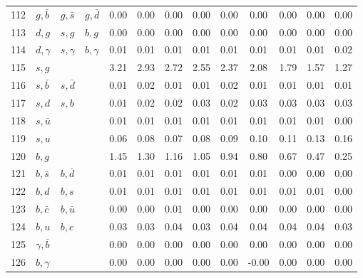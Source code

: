 \begin{tabularx}{\textwidth}{rXXX@{}S@{}S@{}S@{}S@{}S@{}S@{}S@{}S@{}S}
112 & $g, \bar b$      & $g, \bar s$       & $g, \bar d$      &  0.00 &  0.00 &  0.00 &  0.00 &  0.00 &  0.00 &  0.00 &  0.00 &  0.00 \\
113 & $d, g$           & $s,  g$           & $b,  g$          &  0.00 &  0.00 &  0.00 &  0.00 &  0.00 &  0.00 &  0.00 &  0.00 &  0.00 \\
114 & $d, \gamma$      & $s, \gamma$       & $b, \gamma$      &  0.01 &  0.01 &  0.01 &  0.01 &  0.01 &  0.01 &  0.01 &  0.01 &  0.02 \\
115 & $s, g$           &                   &                  &  3.21 &  2.93 &  2.72 &  2.55 &  2.37 &  2.08 &  1.79 &  1.57 &  1.27 \\
116 & $s, \bar b$      & $s, \bar d$       &                  &  0.01 &  0.02 &  0.01 &  0.01 &  0.02 &  0.01 &  0.01 &  0.01 &  0.01 \\
117 & $s, d$           & $s,  b$           &                  &  0.01 &  0.02 &  0.02 &  0.03 &  0.02 &  0.03 &  0.03 &  0.03 &  0.03 \\
118 & $s, \bar u$      &                   &                  &  0.01 &  0.01 &  0.01 &  0.01 &  0.01 &  0.01 &  0.01 &  0.01 &  0.00 \\
119 & $s, u$           &                   &                  &  0.06 &  0.08 &  0.07 &  0.08 &  0.09 &  0.10 &  0.11 &  0.13 &  0.16 \\
120 & $b, g$           &                   &                  &  1.45 &  1.30 &  1.16 &  1.05 &  0.94 &  0.80 &  0.67 &  0.47 &  0.25 \\
121 & $b, \bar s$      & $b, \bar d$       &                  &  0.01 &  0.01 &  0.01 &  0.01 &  0.01 &  0.01 &  0.00 &  0.00 &  0.00 \\
122 & $b, d$           & $b,  s$           &                  &  0.01 &  0.01 &  0.01 &  0.01 &  0.01 &  0.01 &  0.01 &  0.01 &  0.00 \\
123 & $b, \bar c$      & $b, \bar u$       &                  &  0.00 &  0.00 &  0.01 &  0.00 &  0.00 &  0.00 &  0.00 &  0.00 &  0.00 \\
124 & $b, u$           & $b,  c$           &                  &  0.03 &  0.03 &  0.04 &  0.03 &  0.04 &  0.04 &  0.04 &  0.04 &  0.03 \\
125 & $\gamma, \bar b$ &                   &                  &  0.00 &  0.00 &  0.00 &  0.00 &  0.00 &  0.00 &  0.00 &  0.00 &  0.00 \\
126 & $b, \gamma$      &                   &                  &  0.00 &  0.00 &  0.00 &  0.00 &  0.00 & -0.00 &  0.00 &  0.00 &  0.00 \\

\end{tabularx}
